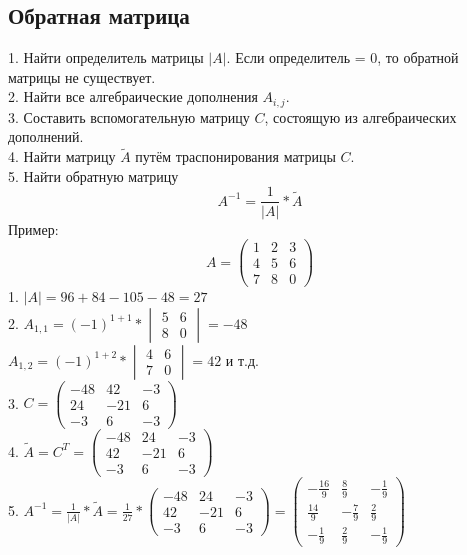 \documentclass[12pt,a4paper]{article}
\begin{document}
\subsection{Обратная матрица}
1. Найти определитель матрицы $|A|$. Если определитель = 0, то обратной матрицы не существует. \\
2. Найти все алгебраические дополнения $A_{i,j}$. \\
3. Составить вспомогательную матрицу $C$, состоящую из алгебраических дополнений. \\
4. Найти матрицу $\tilde{A}$ путём траспонирования матрицы $C$. \\
5. Найти обратную матрицу $$A^{-1}=\frac{1}{|A|}*\tilde{A}$$
Пример:
$$A=\begin{pmatrix}
1& 2& 3 \\
4& 5& 6 \\
7& 8& 0
\end{pmatrix}$$
1. $|A|=96+84-105-48=27$ \\
2. $A_{1,1}=(-1)^{1+1}*\begin{vmatrix}
5& 6 \\
8& 0
\end{vmatrix}=-48$\\
$A_{1,2}=(-1)^{1+2}*\begin{vmatrix}
4& 6 \\
7& 0
\end{vmatrix}=42$ и т.д. \\
3. $C=\begin{pmatrix}
-48& 42& -3 \\
24& -21& 6 \\
-3& 6& -3
\end{pmatrix}$ \\
4. $\tilde{A}=C^{T}=\begin{pmatrix}
-48& 24& -3 \\
42& -21& 6 \\
-3& 6& -3
\end{pmatrix}$ \\
5. $A^{-1}=\frac{1}{|A|}*\tilde{A}=\frac{1}{27}*\begin{pmatrix}
-48& 24& -3 \\
42& -21& 6 \\
-3& 6& -3
\end{pmatrix}=\begin{pmatrix}
-\frac{16}{9}& \frac{8}{9}& -\frac{1}{9} \\
\frac{14}{9}& -\frac{7}{9}& \frac{2}{9} \\
-\frac{1}{9}& \frac{2}{9}& -\frac{1}{9}
\end{pmatrix}$
\end{document}

